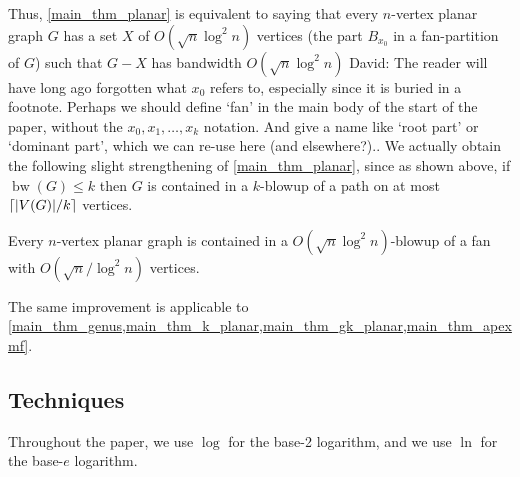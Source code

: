 \documentclass{patmorin}
\renewcommand{\leq}{\leqslant}
\newcommand{\david}[1]{{\color{orange} David: #1}}
\newcommand{\pat}[1]{\textcolor{Blue}{Pat: #1}}
\DeclareMathOperator{\bw}{bw}
\begin{document}
Thus, \cref{main_thm_planar} is equivalent to saying that every $n$-vertex planar graph $G$ has a set $X$ of  $O(\sqrt{n}\log^2 n)$ vertices (the part $B_{x_0}$ in a fan-partition of $G$) such that $G-X$ has bandwidth $O(\sqrt{n}\log^2 n)$ \david{The reader will have long ago forgotten what $x_0$ refers to, especially since it is buried in a footnote. Perhaps we should define `fan' in the main body of the start of the paper, without the $x_0,x_1,\dots,x_k$ notation. And give a name like `root part'  or `dominant part', which we can re-use here (and elsewhere?).}. We actually obtain the following slight strengthening of \cref{main_thm_planar}, since as shown above, if $\bw(G)\leq k$ then $G$ is contained in a $k$-blowup of a path on at most ${\lceil |V(G)|/k \rceil}$ vertices.

\begin{thm}\label{main_thm_planar_order}
  Every $n$-vertex planar graph is contained in a $O(\sqrt{n}\log^2 n)$-blowup of a fan with
  $O(\sqrt{n}/\log^2 n)$ vertices.
\end{thm}

The same improvement is applicable to \cref{main_thm_genus,main_thm_k_planar,main_thm_gk_planar,main_thm_apexmf}. 



\subsection{Techniques}


Throughout the paper, we use $\log$ for the base-2 logarithm, and we use $\ln$ for the base-$e$ logarithm. 
\end{document}
